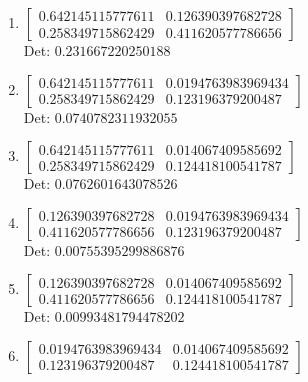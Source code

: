 \documentclass[12pt]{article}
\begin{document}
\begin{enumerate}

\item $\displaystyle \left[\begin{matrix}0.642145115777611 & 0.126390397682728\\0.258349715862429 & 0.411620577786656\end{matrix}\right]$\\

Det: $0.231667220250188$\\

\item $\displaystyle \left[\begin{matrix}0.642145115777611 & 0.0194763983969434\\0.258349715862429 & 0.123196379200487\end{matrix}\right]$\\

Det: $0.0740782311932055$\\

\item $\displaystyle \left[\begin{matrix}0.642145115777611 & 0.014067409585692\\0.258349715862429 & 0.124418100541787\end{matrix}\right]$\\

Det: $0.0762601643078526$\\

\item $\displaystyle \left[\begin{matrix}0.126390397682728 & 0.0194763983969434\\0.411620577786656 & 0.123196379200487\end{matrix}\right]$\\

Det: $0.00755395299886876$\\

\item $\displaystyle \left[\begin{matrix}0.126390397682728 & 0.014067409585692\\0.411620577786656 & 0.124418100541787\end{matrix}\right]$\\

Det: $0.00993481794478202$\\

\item $\displaystyle \left[\begin{matrix}0.0194763983969434 & 0.014067409585692\\0.123196379200487 & 0.124418100541787\end{matrix}\right]$\\


\end{enumerate}
\end{document}
